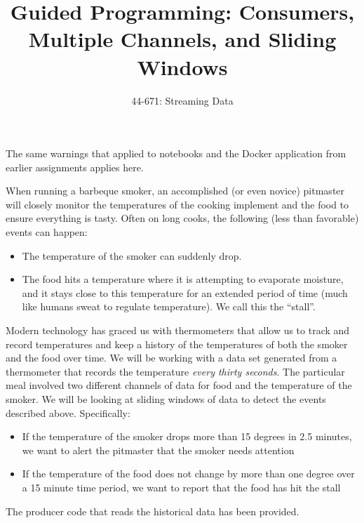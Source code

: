 \documentclass[letterpaper,10pt]{article}
\title{Guided Programming: Consumers, Multiple Channels, and Sliding Windows}
\author{44-671: Streaming Data}
\date{}
\begin{document}
\maketitle

The same warnings that applied to notebooks and the Docker application from earlier assignments applies here.

When running a barbeque smoker, an accomplished (or even novice) pitmaster will closely monitor the temperatures of the cooking implement and the food to ensure everything is tasty.
Often on long cooks, the following (less than favorable) events can happen:
\begin{itemize}
	\item The temperature of the smoker can suddenly drop.
	\item The food hits a temperature where it is attempting to evaporate moisture, and it stays close to this temperature for an extended period of time (much like humans sweat to regulate temperature).  We call this the ``stall''.
\end{itemize}

Modern technology has graced us with thermometers that allow us to track and record temperatures and keep a history of the temperatures of both the smoker and the food over time.
We will be working with a data set generated from a thermometer that records the temperature \emph{every thirty seconds}.
The particular meal involved two different channels of data for food and the temperature of the smoker.
We will be looking at sliding windows of data to detect the events described above.
Specifically:
\begin{itemize}
	\item If the temperature of the smoker drops more than 15 degrees in 2.5 minutes, we want to alert the pitmaster that the smoker needs attention
	\item If the temperature of the food does not change by more than one degree over a 15 minute time period, we want to report that the food has hit the stall
\end{itemize}

The producer code that reads the historical data has been provided.
\end{document}
